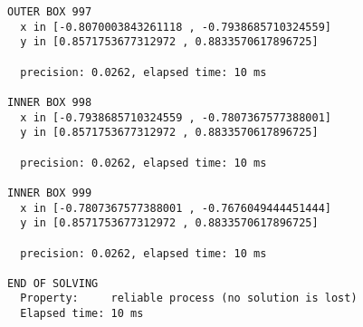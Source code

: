 \begin{verbatim}
OUTER BOX 997
  x in [-0.8070003843261118 , -0.7938685710324559]
  y in [0.8571753677312972 , 0.8833570617896725]

  precision: 0.0262, elapsed time: 10 ms

INNER BOX 998
  x in [-0.7938685710324559 , -0.7807367577388001]
  y in [0.8571753677312972 , 0.8833570617896725]

  precision: 0.0262, elapsed time: 10 ms

INNER BOX 999
  x in [-0.7807367577388001 , -0.7676049444451444]
  y in [0.8571753677312972 , 0.8833570617896725]

  precision: 0.0262, elapsed time: 10 ms

END OF SOLVING
  Property:     reliable process (no solution is lost)
  Elapsed time: 10 ms

\end{verbatim}

